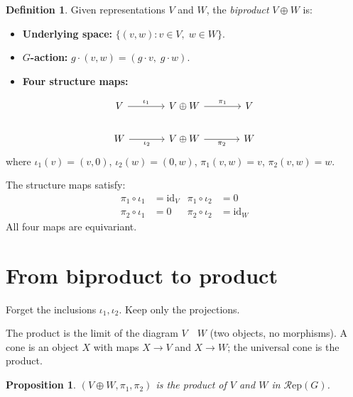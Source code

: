 \documentclass[12pt,a4paper]{article}
\newtheorem{proposition}[theorem]{Proposition}
\theoremstyle{definition}
\newtheorem{definition}[theorem]{Definition}
\theoremstyle{remark}
\newcommand{\id}{\mathrm{id}}
\newcommand{\Rep}{\mathcal{R}\mathrm{ep}}
\begin{document}
\begin{definition}
Given representations $V$ and $W$, the \emph{biproduct} $V \oplus W$ is:
\begin{itemize}
  \item \textbf{Underlying space:} $\{(v,w) : v \in V,\; w \in W\}$.
  \item \textbf{$G$-action:} $g \cdot (v,w) = (g \cdot v,\; g \cdot w)$.
  \item \textbf{Four structure maps:}
\end{itemize}
\[
\begin{tikzcd}[column sep=large]
V \arrow[r, "\iota_1"] & V \oplus W \arrow[r, "\pi_1"] & V \\
W \arrow[r, "\iota_2"'] & V \oplus W \arrow[r, "\pi_2"'] & W
\end{tikzcd}
\]
where $\iota_1(v) = (v,0)$, $\iota_2(w) = (0,w)$, $\pi_1(v,w) = v$, $\pi_2(v,w) = w$.
\end{definition}

The structure maps satisfy:
\begin{align}
\pi_1 \circ \iota_1 &= \id_V & \pi_1 \circ \iota_2 &= 0 \\
\pi_2 \circ \iota_1 &= 0     & \pi_2 \circ \iota_2 &= \id_W
\end{align}
All four maps are equivariant.

\section{From biproduct to product}

Forget the inclusions $\iota_1, \iota_2$. Keep only the projections.

The product is the limit of the diagram $V \quad W$ (two objects, no morphisms).
A cone is an object $X$ with maps $X \to V$ and $X \to W$; the universal cone is the
product.

\begin{proposition}
$(V \oplus W, \pi_1, \pi_2)$ is the product of $V$ and $W$ in $\Rep(G)$.
\end{proposition}
\end{document}

